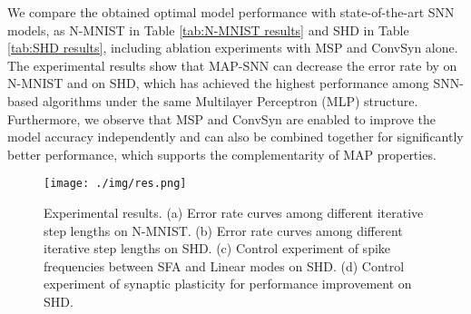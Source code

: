 \documentclass{article}
\begin{document}
\begin{table}
\centering
{}
\caption{Performance of different algorithms on SHD.}
\label{tab:SHD results}
\end{table}
We compare the obtained optimal model performance with state-of-the-art SNN models, as N-MNIST in Table \ref{tab:N-MNIST results} and SHD in Table \ref{tab:SHD results}, including ablation experiments with MSP and ConvSyn alone. The experimental results show that MAP-SNN can decrease the error rate by  on N-MNIST and  on SHD, which has achieved the highest performance among SNN-based algorithms under the same Multilayer Perceptron (MLP) structure. Furthermore, we observe that MSP and ConvSyn are enabled to improve the model accuracy independently and can also be combined together for significantly better performance, which supports the complementarity of MAP properties.

\begin{figure*}[htbp]
    \centering
    \texttt{[image: ./img/res.png]}
    \caption{Experimental results. (a) Error rate curves among different iterative step lengths on N-MNIST. (b) Error rate curves among different iterative step lengths on SHD. (c) Control experiment of spike frequencies between SFA and Linear modes on SHD. (d) Control experiment of synaptic plasticity for performance improvement on SHD.}
    \label{fig:results}
\end{figure*}
\end{document}
